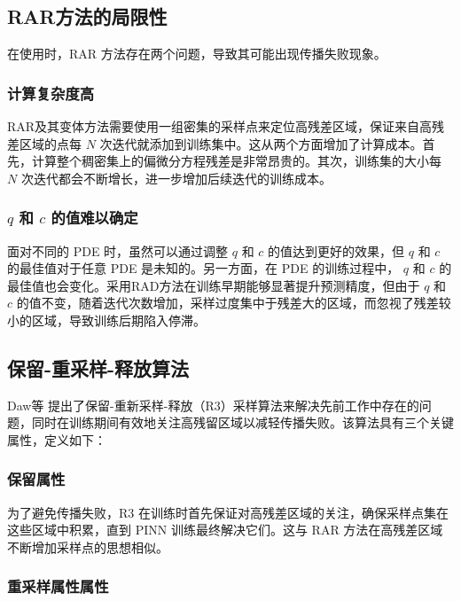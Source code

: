 \subsection{RAR方法的局限性}

在使用时，RAR 方法存在两个问题，导致其可能出现传播失败现象。

\subsubsection{计算复杂度高}

RAR及其变体方法需要使用一组密集的采样点来定位高残差区域，保证来自高残差区域的点每 $N$ 次迭代就添加到训练集中。这从两个方面增加了计算成本。首先，计算整个稠密集上的偏微分方程残差是非常昂贵的。其次，训练集的大小每 $N$ 次迭代都会不断增长，进一步增加后续迭代的训练成本。

\subsubsection{$q$ 和 $c$ 的值难以确定}

面对不同的 PDE 时，虽然可以通过调整 $q$ 和 $c$ 的值达到更好的效果，但 $q$ 和 $c$ 的最佳值对于任意 PDE 是未知的。另一方面，在 PDE 的训练过程中， $q$ 和 $c$ 的最佳值也会变化。采用RAD方法在训练早期能够显著提升预测精度，但由于 $q$ 和 $c$ 的值不变，随着迭代次数增加，采样过度集中于残差大的区域，而忽视了残差较小的区域，导致训练后期陷入停滞。

\subsection{保留-重采样-释放算法}

Daw等 \cite{daw2022mitigating}提出了保留-重新采样-释放（R3）采样算法来解决先前工作中存在的问题，同时在训练期间有效地关注高残留区域以减轻传播失败。该算法具有三个关键属性，定义如下：

\subsubsection{保留属性}

为了避免传播失败，R3 在训练时首先保证对高残差区域的关注，确保采样点集在这些区域中积累，直到 PINN 训练最终解决它们。这与 RAR 方法在高残差区域不断增加采样点的思想相似。

\subsubsection{重采样属性属性}

